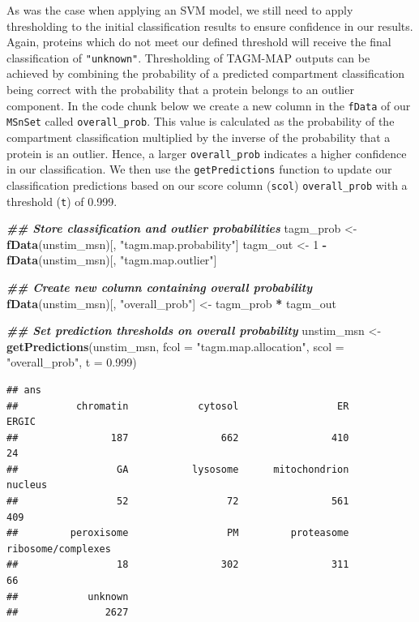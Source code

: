 \documentclass[9pt,a4paper,]{extarticle}
\newenvironment{Shaded}{\begin{snugshade}}{\end{snugshade}}
\newcommand{\AttributeTok}[1]{\textcolor[rgb]{0.13,0.29,0.53}{#1}}
\newcommand{\DecValTok}[1]{\textcolor[rgb]{0.00,0.00,0.81}{#1}}
\newcommand{\DocumentationTok}[1]{\textcolor[rgb]{0.56,0.35,0.01}{\textbf{\textit{#1}}}}
\newcommand{\FloatTok}[1]{\textcolor[rgb]{0.00,0.00,0.81}{#1}}
\newcommand{\FunctionTok}[1]{\textcolor[rgb]{0.13,0.29,0.53}{\textbf{#1}}}
\newcommand{\NormalTok}[1]{#1}
\newcommand{\OtherTok}[1]{\textcolor[rgb]{0.56,0.35,0.01}{#1}}
\newcommand{\SpecialCharTok}[1]{\textcolor[rgb]{0.81,0.36,0.00}{\textbf{#1}}}
\newcommand{\StringTok}[1]{\textcolor[rgb]{0.31,0.60,0.02}{#1}}
\begin{document}
As was the case when applying an SVM model, we still need to apply thresholding
to the initial classification results to ensure confidence in our results. Again,
proteins which do not meet our defined threshold will receive the final
classification of \texttt{"unknown"}. Thresholding of TAGM-MAP outputs can be achieved
by combining the probability of a predicted compartment classification being
correct with the probability that a protein belongs to an outlier component. In
the code chunk below we create a new column in the \texttt{fData} of our \texttt{MSnSet} called
\texttt{overall\_prob}. This value is calculated as the probability of the compartment
classification multiplied by the inverse of the probability that a protein is an
outlier. Hence, a larger \texttt{overall\_prob} indicates a higher confidence in our
classification. We then use the \texttt{getPredictions} function to update our
classification predictions based on our score column (\texttt{scol}) \texttt{overall\_prob} with
a threshold (\texttt{t}) of 0.999.

\begin{Shaded}
\begin{Highlighting}[]
\DocumentationTok{\#\# Store classification and outlier probabilities}
\NormalTok{tagm\_prob }\OtherTok{\textless{}{-}} \FunctionTok{fData}\NormalTok{(unstim\_msn)[, }\StringTok{"tagm.map.probability"}\NormalTok{]}
\NormalTok{tagm\_out }\OtherTok{\textless{}{-}} \DecValTok{1} \SpecialCharTok{{-}} \FunctionTok{fData}\NormalTok{(unstim\_msn)[, }\StringTok{"tagm.map.outlier"}\NormalTok{]}

\DocumentationTok{\#\# Create new column containing overall probability}
\FunctionTok{fData}\NormalTok{(unstim\_msn)[, }\StringTok{"overall\_prob"}\NormalTok{] }\OtherTok{\textless{}{-}}\NormalTok{ tagm\_prob }\SpecialCharTok{*}\NormalTok{ tagm\_out}

\DocumentationTok{\#\# Set prediction thresholds on overall probability}
\NormalTok{unstim\_msn }\OtherTok{\textless{}{-}} \FunctionTok{getPredictions}\NormalTok{(unstim\_msn, }
                             \AttributeTok{fcol =} \StringTok{"tagm.map.allocation"}\NormalTok{, }
                             \AttributeTok{scol =} \StringTok{"overall\_prob"}\NormalTok{, }
                             \AttributeTok{t =} \FloatTok{0.999}\NormalTok{)}
\end{Highlighting}
\end{Shaded}

\begin{verbatim}
## ans
##          chromatin            cytosol                 ER              ERGIC 
##                187                662                410                 24 
##                 GA           lysosome      mitochondrion            nucleus 
##                 52                 72                561                409 
##         peroxisome                 PM         proteasome ribosome/complexes 
##                 18                302                311                 66 
##            unknown 
##               2627
\end{verbatim}
\end{document}
